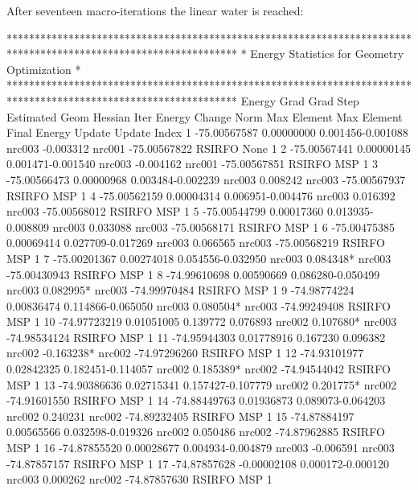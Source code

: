 After seventeen macro-iterations the linear water is reached:

\begin{sourcelisting}
*****************************************************************************************************************
*                                  Energy Statistics for Geometry Optimization                                  *
*****************************************************************************************************************
                       Energy     Grad     Grad              Step                 Estimated   Geom     Hessian
Iter      Energy       Change     Norm     Max    Element    Max     Element     Final Energy Update Update Index
  1    -75.00567587  0.00000000 0.001456-0.001088 nrc003  -0.003312  nrc001      -75.00567822 RSIRFO  None    1
  2    -75.00567441  0.00000145 0.001471-0.001540 nrc003  -0.004162  nrc001      -75.00567851 RSIRFO  MSP     1
  3    -75.00566473  0.00000968 0.003484-0.002239 nrc003   0.008242  nrc003      -75.00567937 RSIRFO  MSP     1
  4    -75.00562159  0.00004314 0.006951-0.004476 nrc003   0.016392  nrc003      -75.00568012 RSIRFO  MSP     1
  5    -75.00544799  0.00017360 0.013935-0.008809 nrc003   0.033088  nrc003      -75.00568171 RSIRFO  MSP     1
  6    -75.00475385  0.00069414 0.027709-0.017269 nrc003   0.066565  nrc003      -75.00568219 RSIRFO  MSP     1
  7    -75.00201367  0.00274018 0.054556-0.032950 nrc003   0.084348* nrc003      -75.00430943 RSIRFO  MSP     1
  8    -74.99610698  0.00590669 0.086280-0.050499 nrc003   0.082995* nrc003      -74.99970484 RSIRFO  MSP     1
  9    -74.98774224  0.00836474 0.114866-0.065050 nrc003   0.080504* nrc003      -74.99249408 RSIRFO  MSP     1
 10    -74.97723219  0.01051005 0.139772 0.076893 nrc002   0.107680* nrc003      -74.98534124 RSIRFO  MSP     1
 11    -74.95944303  0.01778916 0.167230 0.096382 nrc002  -0.163238* nrc002      -74.97296260 RSIRFO  MSP     1
 12    -74.93101977  0.02842325 0.182451-0.114057 nrc002   0.185389* nrc002      -74.94544042 RSIRFO  MSP     1
 13    -74.90386636  0.02715341 0.157427-0.107779 nrc002   0.201775* nrc002      -74.91601550 RSIRFO  MSP     1
 14    -74.88449763  0.01936873 0.089073-0.064203 nrc002   0.240231  nrc002      -74.89232405 RSIRFO  MSP     1
 15    -74.87884197  0.00565566 0.032598-0.019326 nrc002   0.050486  nrc002      -74.87962885 RSIRFO  MSP     1
 16    -74.87855520  0.00028677 0.004934-0.004879 nrc003  -0.006591  nrc003      -74.87857157 RSIRFO  MSP     1
 17    -74.87857628 -0.00002108 0.000172-0.000120 nrc003   0.000262  nrc002      -74.87857630 RSIRFO  MSP     1


\end{sourcelisting}
